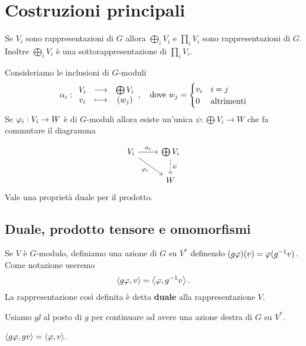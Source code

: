 \section{Costruzioni principali}
\begin{proposition}[]
Se $V_i$ sono rappresentazioni di $G$ allora $\bigoplus_i V_i$ e $\prod_i V_i$ sono rappresentazioni di $G$. Inoltre $\bigoplus_i V_i$ \`e una sottorappresentazione di $\prod_i V_i$.
\end{proposition}

\begin{remark}
Consideriamo le inclusioni di $G$-moduli
\[\alpha_i:\begin{array}{ccc} {V_i} & \longrightarrow & {\bigoplus V_i}\\ {v_i} & \longmapsto & {(w_j)} \end{array},\quad\text{dove }w_j=\begin{cases}
v_i &i=j\\
0 &\text{altrimenti}
\end{cases}\]
Se $\varphi_i:V_i\to W$ \`e di $G$-moduli allora esiste un'unica $\psi:\bigoplus V_i\to W$ che fa commutare il diagramma

\[\begin{tikzcd}
	{V_i} & {\bigoplus V_i} \\
	& W
	\arrow["{\al_i}", from=1-1, to=1-2]
	\arrow["{\vp_i}"', from=1-1, to=2-2]
	\arrow["\psi", dashed, from=1-2, to=2-2]
\end{tikzcd}\]
Vale una propriet\`a duale per il prodotto.
\end{remark}


\subsection{Duale, prodotto tensore e omomorfismi}
\begin{definition}
Se $V$ \`e $G$-modulo, definiamo una azione di $G$ su $V^\ast$ definendo $(g\varphi)(v)=\varphi(g^{-1} v)$. Come notazione useremo
\[\left\langle {g\varphi,v}\right\rangle=\left\langle {\varphi,g^{-1}v}\right\rangle.\]
La rappresentazione cos\`i definita \`e detta \textbf{duale} alla rappresentazione $V$.
\end{definition}

\begin{remark}
Usiamo $g\ii$ al posto di $g$ per continuare ad avere una azione destra di $G$ su $V^\ast$.
\end{remark}

\begin{remark}
$\left\langle {g\varphi,gv}\right\rangle=\left\langle {\varphi,v}\right\rangle$.
\end{remark}


